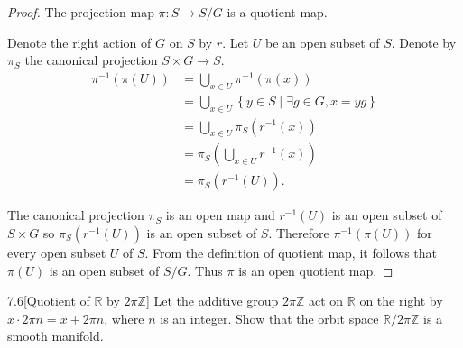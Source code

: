 \begin{proof}
	The projection map \( \pi: S \to S/G \) is a quotient map.

	Denote the right action of \( G \) on \( S \) by \( r \). Let \( U \) be an open subset of \( S \). Denote by \( \pi_{S} \) the canonical projection \( S\times G \to S \).
	\begingroup
	\allowdisplaybreaks%
	\begin{align*}
		\pi^{-1}(\pi(U)) & = \bigcup_{x\in U} \pi^{-1}(\pi(x))                                     \\
		                 & = \bigcup_{x\in U} \left\{ y \in S \mid \exists g\in G, x = yg \right\} \\
		                 & = \bigcup_{x\in U} \pi_{S}(r^{-1}(x))                                   \\
		                 & = \pi_{S}\left(\bigcup_{x\in U} r^{-1}(x)\right)                        \\
		                 & = \pi_{S}(r^{-1}(U)).
	\end{align*}
	\endgroup

	The canonical projection \( \pi_{S} \) is an open map and \( r^{-1}(U) \) is an open subset of \( S\times G \) so \( \pi_{S}(r^{-1}(U)) \) is an open subset of \( S \). Therefore \( \pi^{-1}(\pi(U)) \) for every open subset \( U \) of \( S \). From the definition of quotient map, it follows that \( \pi(U) \) is an open subset of \( S/G \). Thus \( \pi \) is an open quotient map.
\end{proof}

\begin{problem}{7.6}[Quotient of \( \mathbb{R} \) by \( 2\pi\mathbb{Z} \)]\label{problem:7.6}
Let the additive group \( 2\pi\mathbb{Z} \) act on \( \mathbb{R} \) on the right by \( x\cdot 2\pi n = x + 2\pi n \), where \( n \) is an integer. Show that the orbit space \( \mathbb{R}/2\pi\mathbb{Z} \) is a smooth manifold.
\end{problem}

